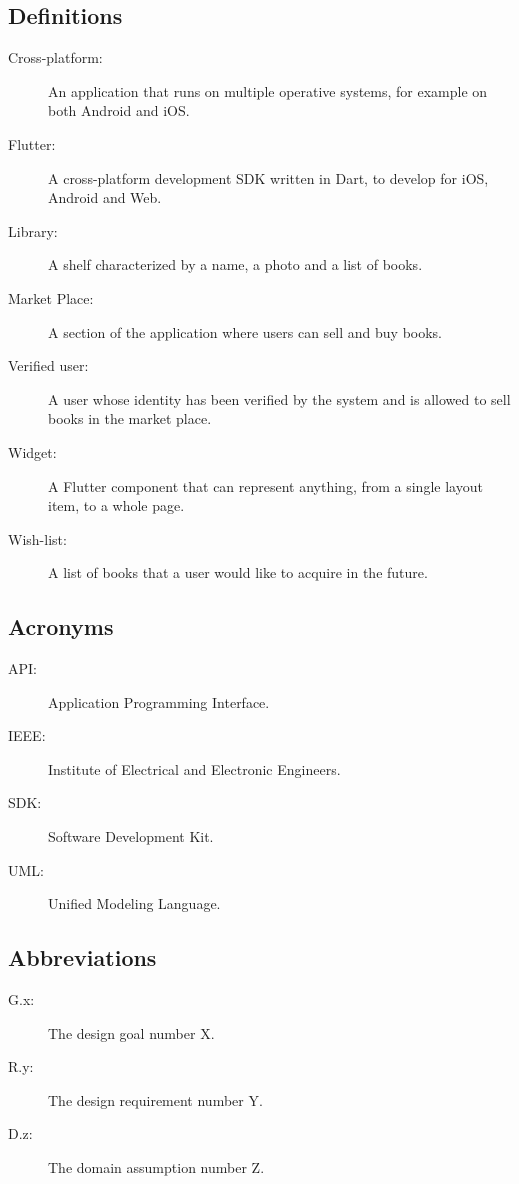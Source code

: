 \subsection{Definitions}
\begin{description}
    \item[Cross-platform:] An application that runs on multiple operative systems, for example on both Android and iOS.
    \item[Flutter:] A cross-platform development SDK written in Dart, to develop for iOS, Android and Web.
    \item[Library:] A shelf characterized by a name, a photo and a list of books. 
    \item[Market Place:] A section of the application where users can sell and buy books.
    \item[Verified user:] A user whose identity has been verified by the system and is allowed to sell books in the market place.   
    \item[Widget:] A Flutter component that can represent anything, from a single layout item, to a whole page.
    \item[Wish-list:] A list of books that a user would like to acquire in the future. 
\end{description}


\subsection{Acronyms}
\begin{description}
    \item[API:] Application Programming Interface.
    \item[IEEE:] Institute of Electrical and Electronic Engineers.
    \item[SDK:] Software Development Kit. 
    \item[UML:] Unified Modeling Language. 
\end{description}
\subsection{Abbreviations}
\begin{description}
    \item[G.x:] The design goal number X.
    \item[R.y:] The design requirement number Y.
    \item[D.z:] The domain assumption number Z.  
\end{description}

